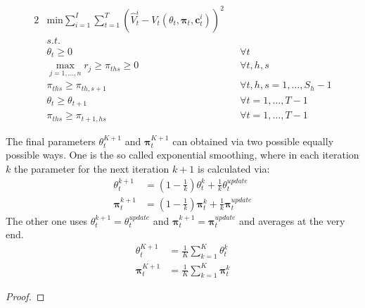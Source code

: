 \begin{alignat}{2}
& \text{min} \sum_{i=1}^{I}\sum_{t=1}^{T} \left( \hat{V}_t^i - V_t(\theta_t, \boldsymbol{\pi}_t, \boldsymbol{c}_t^i) \right)^2 && \\
& s.t. && \\
& \theta_t \geq 0 && \forall t\\
& \max_{j=1, \dots, n} r_j \geq \pi_{ths} \geq 0 && \forall t, h, s\\
& \pi_{ths} \geq \pi_{th,s+1} && \forall t, h, s = 1, \dots, S_h-1\\
& \theta_t \geq \theta_{t+1} && \forall t = 1, \dots, T-1\\
& \pi_{ths} \geq \pi_{t+1,hs} && \forall t = 1, \dots, T-1
\end{alignat}

The final parameters $\theta_t^{K+1}$ and $\boldsymbol{\pi}_t^{K+1}$ can obtained via two possible equally possible ways. One is the so called exponential smoothing, where in each iteration $k$ the parameter for the next iteration $k+1$ is calculated via:
\begin{align}
\theta_t^{k+1} &= \left(1- \frac{1}{k} \right)	\theta_t^k + \frac{1}{k} \theta_t^{update}\\
\boldsymbol{\pi}_t^{k+1} &= \left(1- \frac{1}{k} \right)	\boldsymbol{\pi}_t^k + \frac{1}{k} \boldsymbol{\pi}_t^{update}
\end{align}
The other one uses $\theta_t^{k+1} = \theta_t^{update}$ and $\boldsymbol{\pi}_t^{k+1} = \boldsymbol{\pi}_t^{update}$ and averages at the very end.
\begin{align}
\theta_t^{K+1} &= \frac{1}{K}\sum_{k=1}^{K}\theta_t^k\\
\boldsymbol{\pi}_t^{K+1} &= \frac{1}{K}\sum_{k=1}^{K}\boldsymbol{\pi}_t^k
\end{align}

\begin{proof}
\end{proof}



